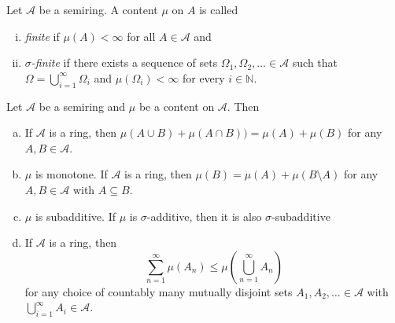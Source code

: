\begin{definition}
    Let $\mathcal{A}$ be a semiring. A content $\mu$ on $A$ is called
    \begin{enumerate}[(i)]
        \item \textit{finite} if $\mu(A)<\infty$ for all $A\in\mathcal{A}$ and
        \item \textit{$\sigma$-finite} if there exists a sequence of sets $\Omega_1,\Omega_2,\ldots\in\mathcal{A}$ such that $\Omega=\bigcup_{i=1}^\infty\Omega_i$ and $\mu(\Omega_i)<\infty$ for every $i\in\mathbb{N}$.
    \end{enumerate}
\end{definition}

\vspace{2mm}
\begin{theorem}
\label{properties of content}
    Let $\mathcal{A}$ be a semiring and $\mu$ be a content on $\mathcal{A}$. Then
    \begin{enumerate}[(a)]
        \item If $\mathcal{A}$ is a ring, then $\mu(A\cup B)+\mu(A\cap B))=\mu(A)+\mu(B)$ for any $A,B\in\mathcal{A}$.
        
        \item $\mu$ is monotone. If $\mathcal{A}$ is a ring, then $\mu(B)=\mu(A)+\mu(B\setminus A)$ for any $A,B\in\mathcal{A}$ with $A\subseteq B$.
        
        \item $\mu$ is subadditive. If $\mu$ is $\sigma$-additive, then it is also $\sigma$-subadditive
        
        \item If $\mathcal{A}$ is a ring, then $$\sum_{n=1}^\infty \mu(A_n)\leq\mu\left(\bigcup_{n=1}^\infty A_n\right)$$ for any choice of countably many mutually disjoint sets $A_1,A_2,\ldots\in\mathcal{A}$ with $\bigcup_{i=1}^\infty A_i\in\mathcal{A}$.
    \end{enumerate}
\end{theorem}
